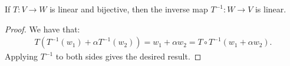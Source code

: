     \begin{proposition}
        If $T:V \rightarrow W$ is linear and bijective, then the inverse map $T^{-1}:W \rightarrow V$ is linear.
    \end{proposition}
        \begin{proof}
            We have that:
                \begin{equation*}
                \begin{split}
                    T(T^{-1}(w_1) + \alpha T^{-1}(w_2)) = w_1 + \alpha w_2 = T \circ T^{-1}(w_1 + \alpha w_2).
                \end{split}
                \end{equation*}
            Applying $T^{-1}$ to both sides gives the desired result.
        \end{proof}

